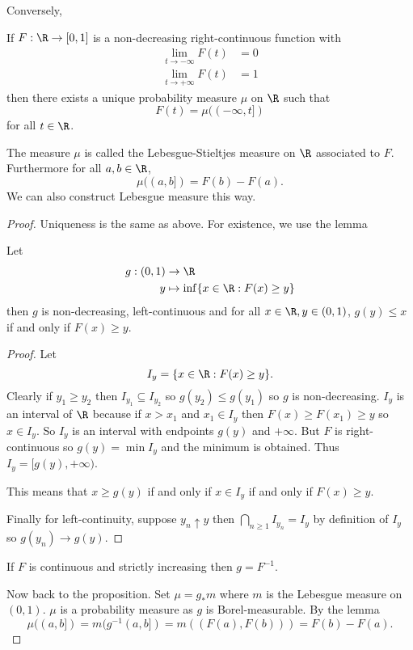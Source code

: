 \documentclass[a4paper]{article}
\begin{document}
Conversely,
\begin{proposition}
  If \(F: \R \to [0, 1]\) is a non-decreasing right-continuous function with
  \begin{align*}
    \lim_{t \to -\infty} F(t) &= 0 \\
    \lim_{t \to +\infty} F(t) &= 1
  \end{align*}
  then there exists a unique probability measure \(\mu\) on \(\R\) such that
  \[
    F(t) = \mu((-\infty, t])
  \]
  for all \(t \in \R\).
\end{proposition}

\begin{remark}
  The measure \(\mu\) is called the Lebesgue-Stieltjes measure on \(\R\) associated to \(F\). Furthermore for all \(a, b \in \R\),
  \[
    \mu((a, b]) = F(b) - F(a).
  \]
  We can also construct Lebesgue measure this way.
\end{remark}

\begin{proof}
  Uniqueness is the same as above. For existence, we use the lemma
  \begin{lemma}
    Let
    \begin{align*}
      g: (0, 1) &\to \R \\
      y &\mapsto \inf \{x \in \R: F(x) \geq y\}
    \end{align*}
    then \(g\) is non-decreasing, left-continuous and for all \(x \in \R, y \in (0, 1)\), \(g(y) \leq x\) if and only if \(F(x) \geq y\).
  \end{lemma}

  \begin{proof}
    Let
    \[
      I_y = \{x \in \R: F(x) \geq y\}.
    \]
    Clearly if \(y_1 \geq y_2\) then \(I_{y_1} \subseteq I_{y_2}\) so \(g(y_2) \leq g(y_1)\) so \(g\) is non-decreasing. \(I_y\) is an interval of \(\R\) because if \(x > x_1\) and \(x_1 \in I_y\) then \(F(x) \geq F(x_1) \geq y\) so \(x \in I_y\). So \(I_y\) is an interval with endpoints \(g(y)\) and \(+ \infty\). But \(F\) is right-continuous so \(g(y) = \min I_y\) and the minimum is obtained. Thus \(I_y = [g(y), + \infty)\).

    This means that \(x \geq g(y)\) if and only if \(x \in I_y\) if and only if \(F(x) \geq y\).

    Finally for left-continuity, suppose \(y_n \uparrow y\) then \(\bigcap_{n \geq 1} I_{y_n} = I_y\) by definition of \(I_y\) so \(g(y_n) \to g(y)\).
  \end{proof}
  \begin{remark}
    If \(F\) is continuous and strictly increasing then \(g = F^{-1}\).
  \end{remark}

  Now back to the proposition. Set \(\mu = g_* m\) where \(m\) is the Lebesgue measure on \((0, 1)\). \(\mu\) is a probability measure as \(g\) is Borel-measurable. By the lemma
  \[
    \mu((a, b]) = m(g^{-1}(a, b]) = m((F(a), F(b))) = F(b) - F(a).
  \]
\end{proof}
\end{document}
